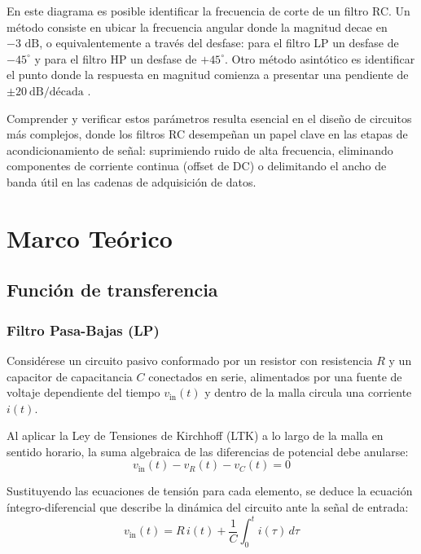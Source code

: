 \documentclass[twocolumn]{article}
\begin{document}
En este diagrama es posible identificar la frecuencia de corte de un filtro RC. Un método consiste en ubicar la frecuencia angular donde la magnitud decae en $-3\text{ dB}$, o equivalentemente a través del desfase: para el filtro LP un desfase de $-45^\circ$ y para el filtro HP un desfase de $+45^\circ$. Otro método asintótico es identificar el punto donde la respuesta en magnitud comienza a presentar una pendiente de $\pm20~\text{dB/década}$ \cite{boylestad2018introduccion, alexander2018fundamentos}.

Comprender y verificar estos parámetros resulta esencial en el diseño de circuitos más complejos, donde los filtros RC desempeñan un papel clave en las etapas de acondicionamiento de señal: suprimiendo ruido de alta frecuencia, eliminando componentes de corriente continua (offset de DC) o delimitando el ancho de banda útil en las cadenas de adquisición de datos.

\newpage

\section{Marco Teórico}

\subsection{Función de transferencia}
\subsubsection{Filtro Pasa-Bajas (LP)}

Considérese un circuito pasivo conformado por un resistor con resistencia $R$ y un capacitor de capacitancia $C$ conectados en serie, alimentados por una fuente de voltaje dependiente del tiempo $v_{\text{in}}(t)$ y dentro de la malla circula una corriente $i(t)$.

Al aplicar la Ley de Tensiones de Kirchhoff (LTK) a lo largo de la malla en sentido horario, la suma algebraica de las diferencias de potencial debe anularse:
\begin{equation}
v_{\text{in}}(t) - v_R(t) - v_C(t) = 0
\end{equation}

Sustituyendo las ecuaciones de tensión para cada elemento, se deduce la ecuación íntegro-diferencial que describe la dinámica del circuito ante la señal de entrada:
\begin{equation}
v_{\text{in}}(t) = R \, i(t) + \frac{1}{C} \int_{0}^{t} i(\tau) \, d\tau
\label{eq:vin_temporal_lp}
\end{equation}
\end{document}
